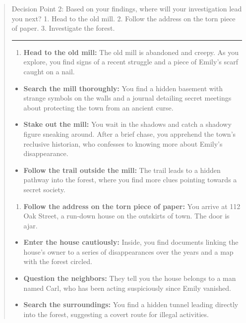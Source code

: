 \documentclass[fleqn,10pt]{wlscirep}
\providecommand{\tightlist}{%
  \setlength{\itemsep}{0pt}\setlength{\parskip}{0pt}}
\begin{document}
\begin{quote}
Decision Point 2: Based on your findings, where will your investigation
lead you next? 1. Head to the old mill. 2. Follow the address on the
torn piece of paper. 3. Investigate the forest.

\begin{center}\rule{0.5\linewidth}{0.5pt}\end{center}

\begin{enumerate}
\def\labelenumi{\arabic{enumi}.}
\tightlist
\item
  \textbf{Head to the old mill:} The old mill is abandoned and creepy.
  As you explore, you find signs of a recent struggle and a piece of
  Emily's scarf caught on a nail.
\end{enumerate}

\begin{itemize}
\item
  \textbf{Search the mill thoroughly:} You find a hidden basement with
  strange symbols on the walls and a journal detailing secret meetings
  about protecting the town from an ancient curse.
\item
  \textbf{Stake out the mill:} You wait in the shadows and catch a
  shadowy figure sneaking around. After a brief chase, you apprehend the
  town's reclusive historian, who confesses to knowing more about
  Emily's disappearance.
\item
  \textbf{Follow the trail outside the mill:} The trail leads to a
  hidden pathway into the forest, where you find more clues pointing
  towards a secret society.
\end{itemize}

\begin{enumerate}
\def\labelenumi{\arabic{enumi}.}
\setcounter{enumi}{1}
\tightlist
\item
  \textbf{Follow the address on the torn piece of paper:} You arrive at
  112 Oak Street, a run-down house on the outskirts of town. The door is
  ajar.
\end{enumerate}

\begin{itemize}
\item
  \textbf{Enter the house cautiously:} Inside, you find documents
  linking the house's owner to a series of disappearances over the years
  and a map with the forest circled.
\item
  \textbf{Question the neighbors:} They tell you the house belongs to a
  man named Carl, who has been acting suspiciously since Emily vanished.
\item
  \textbf{Search the surroundings:} You find a hidden tunnel leading
  directly into the forest, suggesting a covert route for illegal
  activities.
\end{itemize}


\end{quote}
\end{document}
